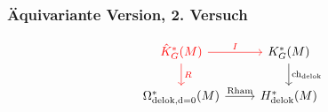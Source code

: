 \documentclass[12pt,utf8,notheorems,compress,t]{beamer}
\renewcommand{\_}{\mathpunct{.}}
\newcommand{\?}{\,{:}\,}
\newcommand{\dd}{\textup{d}}
\begin{document}
\begin{frame}\frametitle{Äquivariante Version, 2. Versuch}
\begin{equation}\begin{tikzcd}[ampersand replacement=\&]
        \textcolor{red}{\hat K_G^*(M)} \arrow[d,
        "R", red]\arrow[r, "I", red] \& K_G^*(M)\arrow[d,
        "\mathrm{ch}_{\mathrm{delok}}"] \\ 
        \Omega^*_{\mathrm{delok}, \dd=0}(M) \arrow[r, "\mathrm{Rham}"]\&
        H_{\mathrm{delok}}^*(M)
\end{tikzcd}\nonumber
\end{equation}

\end{frame}
\end{document}

